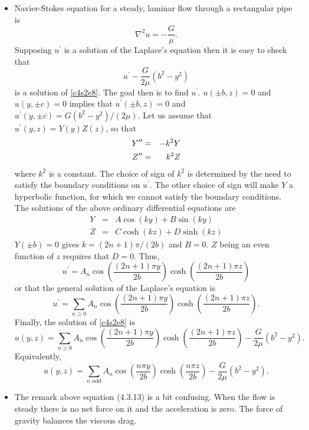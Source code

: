 \begin{itemize}
\item Navier-Stokes equation for a steady, laminar flow through a rectangular pipe is
\begin{equation}\label{c4s2e8}
\nabla^2 u = -\frac{G}{\mu}.
\end{equation}
Supposing $u^\prime$ is a solution of the Laplace's equation then it is easy to check
that
\[
u^\prime - \frac{G}{2\mu}(b^2 - y^2)
\]
is a solution of \eqref{c4s2e8}. The goal then is to find $u^\prime$. $u(\pm b, z) = 0$ and 
$u(y, \pm c) = 0$ implies that $u^\prime(\pm b, z) = 0$ and $u^\prime(y, \pm c) = G(b^2 - y^2)/(2\mu)$.
Let us assume that $u^\prime(y, z) = Y(y)Z(z)$, so that
\begin{eqnarray*}
Y^{\prime\prime} &=& -k^2 Y \\
Z^{\prime\prime} &=& k^2 Z
\end{eqnarray*}
where $k^2$ is a constant. The choice of sign of $k^2$ is determined by the need to satisfy the
boundary conditions on $u^\prime$. The other choice of sign will make $Y$ a hyperbolic function,
for which we cannot satisfy the boundary conditions. The solutions of the above ordinary differential
equations are
\begin{eqnarray*}
Y &=& A\cos(ky) + B\sin(ky) \\
Z &=& C\cosh(kz) + D\sinh(kz)
\end{eqnarray*}
$Y(\pm b) = 0$ gives $k = (2n+1)\pi/(2b)$ and $B = 0$. $Z$ being an even function of $z$ requires that
$D = 0$. Thus,
\[
u^\prime = A_n\cos\left(\frac{(2n+1)\pi y}{2b}\right)\cosh\left(\frac{(2n+1)\pi z}{2b}\right)
\]
or that the general solution of the Laplace's equation is
\begin{equation}\label{c4s2e9}
u^\prime = \sum_{n \ge 0}A_n\cos\left(\frac{(2n+1)\pi y}{2b}\right)\cosh\left(\frac{(2n+1)\pi z}{2b}\right).
\end{equation}
Finally, the solution of \eqref{c4s2e8} is
\begin{equation}\label{c4s2e10}
u(y,z)=\sum_{n \ge 0}A_n\cos\left(\frac{(2n+1)\pi y}{2b}\right)\cosh\left(\frac{(2n+1)\pi z}{2b}\right) - \frac{G}{2\mu}(b^2 - y^2).
\end{equation}
Equivalently,
\begin{equation}\label{c4s2e11}
u(y,z)=\sum_{n \text{ odd}}A_n\cos\left(\frac{n\pi y}{2b}\right)\cosh\left(\frac{n\pi z}{2b}\right) - \frac{G}{2\mu}(b^2 - y^2).
\end{equation}

\item The remark above equation (4.3.13) is a bit confusing. When the flow is steady there is no
net force on it and the acceleration is zero. The force of gravity balances the viscous drag.


\end{itemize}
